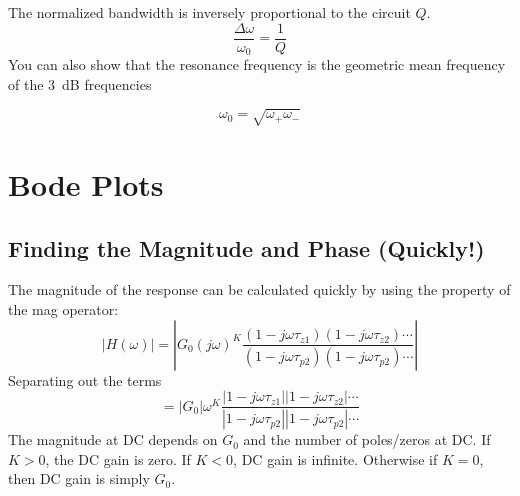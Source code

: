  The normalized bandwidth is inversely proportional to
the circuit $Q$.
\begin{equation}
     \frac{\Delta\omega}{\omega_0} =\frac{1}{Q}
\end{equation}
%
 You can also show that the resonance frequency is the geometric
  mean frequency of the $3$~dB frequencies


%
\begin{equation}
     \omega_0 = \sqrt{\omega_+ \omega_-}
\end{equation}






\section{Bode Plots}








\subsection{Finding the Magnitude and Phase (Quickly!)}

The magnitude of the response can be calculated quickly by using the property of the mag operator:
\begin{equation}
	\left| {H(\omega )} \right| = 
		\left| {{G_0}{{(j\omega )}^K}
			\frac{{(1 - j\omega {\tau _{z1}})(1 - j\omega {\tau _{z2}}) \cdots }}
				{{(1 - j\omega {\tau _{p2}})(1 - j\omega {\tau _{p2}}) \cdots }}} \right|
\end{equation}
Separating out the terms
\begin{equation}
		   = \left| {{G_0}} \right|{\omega ^K}
		 	\frac{{\left| {1 - j\omega {\tau _{z1}}} \right|\left| {1 - j\omega {\tau _{z2}}} \right| \cdots }}
				{{\left| {1 - j\omega {\tau _{p2}}} \right|\left| {1 - j\omega {\tau _{p2}}} \right| \cdots }}
\end{equation}
%
The magnitude at DC depends on $G_0$  and the number of poles/zeros at DC. If $K > 0$,  the DC gain is zero. If $K < 0$, DC gain is infinite. Otherwise if $K = 0$, then DC gain is simply $G_0$.
 
